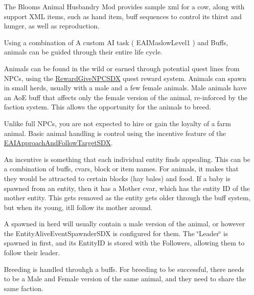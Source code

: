 The Bloom\textquotesingle{}s Animal Husbandry Mod provides sample xml for a cow, along with support X\+ML items, such as hand item, buff sequences to control its thirst and hunger, as well as reproduction.

Using a combination of A custom AI task ( E\+A\+I\+Maslow\+Level1 ) and Buffs, animals can be guided through their entire life cycle.

Animals can be found in the wild or earned through potential quest lines from N\+P\+Cs, using the \mbox{\hyperlink{class_reward_give_n_p_c_s_d_x}{Reward\+Give\+N\+P\+C\+S\+DX}} quest reward system. Animals can spawn in small herds, usually with a male and a few female animals. Male animals have an AoE buff that affects only the female version of the animal, re-\/inforced by the faction system. This allows the opportunity for the animals to breed.

Unlike full N\+P\+Cs, you are not expected to hire or gain the loyalty of a farm animal. Basic animal handling is control using the incentive feature of the \mbox{\hyperlink{class_e_a_i_approach_and_follow_target_s_d_x}{E\+A\+I\+Approach\+And\+Follow\+Target\+S\+DX}}.

An incentive is something that each individual entity finds appealing. This can be a combination of buffs, cvars, block or item names. For animals, it makes that they would be attracted to certain blocks (hay bales) and food. If a baby is spawned from an entity, then it has a Mother cvar, which has the entity ID of the mother entity. This gets removed as the entity gets older through the buff system, but when it\textquotesingle{}s young, it\textquotesingle{}ll follow its mother around.

A spawned in herd will usually contain a male version of the animal, or however the Entity\+Alive\+Event\+Spawnder\+S\+DX is configured for them. The \char`\"{}\+Leader\char`\"{} is spawned in first, and its Entity\+ID is stored with the Followers, allowing them to follow their leader.


\begin{DoxyCode}{0}
\DoxyCodeLine{<\textcolor{keywordtype}{property} \textcolor{keyword}{name}=\textcolor{stringliteral}{"AITask-7"} \textcolor{keyword}{value}=\textcolor{stringliteral}{"ApproachAndFollowTargetSDX, Mods"} \textcolor{keyword}{param1}=\textcolor{stringliteral}{"Mother,Leader,hayBaleBlock,foodCornOnTheCob"}/>}
\end{DoxyCode}


Breeding is handled throuhgh a buffs. For breeding to be successful, there needs to be a Male and Female version of the same animal, and they need to share the same faction.

